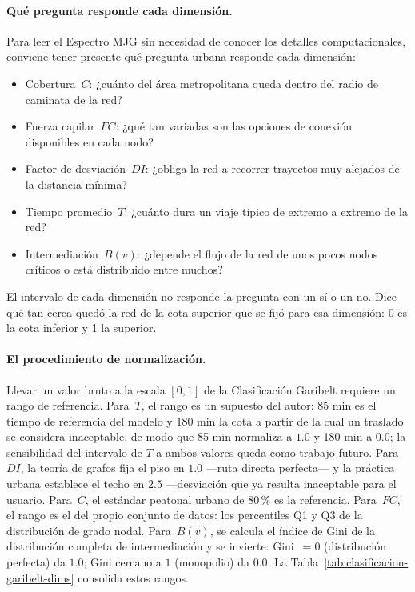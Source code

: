 \paragraph{Qué pregunta responde cada dimensión.}
\label{subsubsec:garibelt-preguntas}

Para leer el Espectro MJG sin necesidad de conocer los detalles computacionales,
conviene tener presente qué pregunta urbana responde cada dimensión:
\begin{itemize}
    \item Cobertura~$C$: ¿cuánto del área metropolitana queda dentro del
          radio de caminata de la red?
    \item Fuerza capilar~$FC$: ¿qué tan variadas son las opciones de
          conexión disponibles en cada nodo?
    \item Factor de desviación~$DI$: ¿obliga la red a recorrer
          trayectos muy alejados de la distancia mínima?
    \item Tiempo promedio~$T$: ¿cuánto dura un viaje típico de extremo
          a extremo de la red?
    \item Intermediación~$B(v)$: ¿depende el flujo de la red de unos
          pocos nodos críticos o está distribuido entre muchos?
\end{itemize}
El intervalo de cada dimensión no responde la pregunta con un sí o un no. Dice
qué tan cerca quedó la red de la cota superior que se fijó para esa dimensión:
0 es la cota inferior y 1 la superior.

\paragraph{El procedimiento de normalización.}
\label{subsubsec:garibelt-procedimiento}

Llevar un valor bruto a la escala $[0, 1]$ de la Clasificación Garibelt requiere
un rango de referencia. Para~$T$, el rango es un supuesto del autor: 85 min es
el tiempo de referencia del modelo y 180 min la cota a partir de la cual un
traslado se considera inaceptable, de modo que 85 min normaliza a $1.0$ y
180 min a $0.0$; la sensibilidad del intervalo de $T$ a ambos valores queda como
trabajo futuro. Para~$DI$, la teoría de grafos fija el piso en $1.0$
---ruta directa perfecta--- y la práctica urbana establece el techo en $2.5$
---desviación que ya resulta inaceptable para el usuario. Para~$C$, el estándar
peatonal urbano de 80\,\% es la referencia. Para~$FC$, el rango es el del propio
conjunto de datos: los percentiles Q1 y Q3 de la distribución de grado nodal. Para~$B(v)$,
se calcula el índice de Gini de la distribución completa de intermediación y se
invierte: Gini~$= 0$ (distribución perfecta) da $1.0$; Gini cercano a $1$
(monopolio) da $0.0$. La Tabla~\ref{tab:clasificacion-garibelt-dims} consolida
estos rangos.

